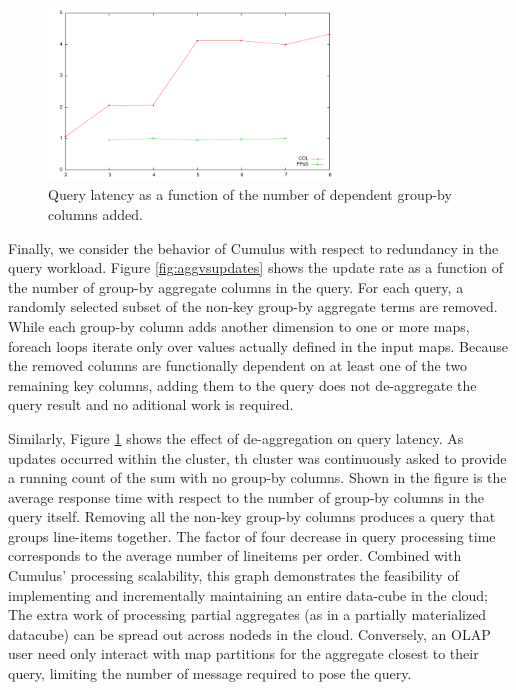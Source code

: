 \begin{figure}
\begin{center}
\includegraphics[width=3.0in]{images/aggvslatency.pdf}
\caption{Query latency as a function of the number of dependent group-by columns added.}
\label{fig:aggvslatency}
\end{center}
\end{figure}
Finally, we consider the behavior of Cumulus with respect to redundancy in the query workload.  Figure \ref{fig:aggvsupdates} shows the update rate as a function of the number of group-by aggregate columns in the query.  For each query, a randomly selected subset of the non-key group-by aggregate terms are removed.  While each group-by column adds another dimension to one or more maps, foreach loops iterate only over values actually defined in the input maps.  Because the removed columns are functionally dependent on at least one of the two remaining key columns, adding them to the query does not de-aggregate the query result and no aditional work is required.

Similarly, Figure \ref{fig:aggvslatency} shows the effect of de-aggregation on query latency.  As updates occurred within the cluster, th cluster was continuously asked to provide a running count of the sum with no group-by columns.  Shown in the figure is the average response time with respect to the number of group-by columns in the query itself.  Removing all the non-key group-by columns produces a query that groups line-items together.  The factor of four decrease in query processing time corresponds to the average number of lineitems per order.  Combined with Cumulus' processing scalability, this graph demonstrates the feasibility of implementing and incrementally maintaining an entire data-cube in the cloud; The extra work of processing partial aggregates (as in a partially materialized datacube) can be spread out across nodeds in the cloud.  Conversely, an OLAP user need only interact with map partitions for the aggregate closest to their query, limiting the number of message required to pose the query.


